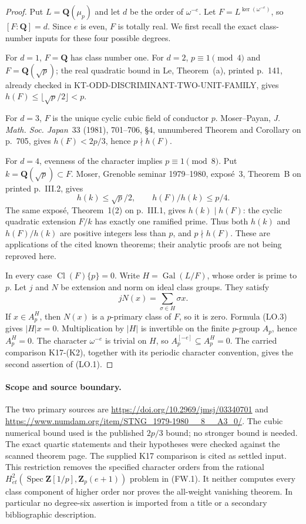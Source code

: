 \begin{proof}
Put $L=\mathbf Q(\mu_p)$ and let $d$ be the order of
$\omega^{-e}$. Let $F=L^{\ker(\omega^{-e})}$, so
$[F:\mathbf Q]=d$. Since $e$ is even, $F$ is totally real.
We first recall the exact class-number inputs for these four
possible degrees.

For $d=1$, $F=\mathbf Q$ has class number one. For $d=2$,
$p\equiv1\pmod4$ and $F=\mathbf Q(\sqrt p)$; the real
quadratic bound in Le, Theorem~(a), printed p.~141, already
checked in KT-ODD-DISCRIMINANT-TWO-UNIT-FAMILY, gives
$h(F)\le\lfloor\sqrt p/2\rfloor<p$.

For $d=3$, $F$ is the unique cyclic cubic field of conductor
$p$. Moser--Payan, \emph{J. Math. Soc. Japan}~33 (1981),
701--706, \S4, unnumbered Theorem and Corollary on p.~705,
gives $h(F)<2p/3$, hence $p\nmid h(F)$.

For $d=4$, evenness of the character implies
$p\equiv1\pmod8$. Put $k=\mathbf Q(\sqrt p)\subset F$.
Moser, Grenoble seminar 1979--1980, expos\'e~3,
Theorem~B on printed p.~III.2, gives
\[
            h(k)\le\sqrt p/2,\qquad h(F)/h(k)\le p/4.  \tag{LO.2}
\]
The same expos\'e, Theorem~1(2) on p.~III.1, gives
$h(k)\mid h(F)$: the cyclic quadratic extension $F/k$
has exactly one ramified prime. Thus both $h(k)$ and
$h(F)/h(k)$ are positive integers less than $p$, and
$p\nmid h(F)$. These are applications of the cited known
theorems; their analytic proofs are not being reproved here.

In every case $\operatorname{Cl}(F)\{p\}=0$.
Write $H=\operatorname{Gal}(L/F)$, whose order is prime to
$p$. Let $j$ and $N$ be extension and norm on ideal class
groups. They satisfy
\[
                      jN(x)=\sum_{\sigma\in H}\sigma x.
                                                               \tag{LO.3}
\]
If $x\in A_p^H$, then $N(x)$ is a $p$-primary class of $F$,
so it is zero. Formula (LO.3) gives $|H|x=0$.
Multiplication by $|H|$ is invertible on the finite $p$-group
$A_p$, hence $A_p^H=0$. The character $\omega^{-e}$ is
trivial on $H$, so $A_p^{[-e]}\subseteq A_p^H=0$.
The carried comparison K17-(K2), together with its periodic
character convention, gives the second assertion of (LO.1).
\end{proof}

\paragraph{Scope and source boundary.}
The two primary sources are
\url{https://doi.org/10.2969/jmsj/03340701} and
\url{https://www.numdam.org/item/STNG_1979-1980__8__A3_0/}.
The cubic numerical bound used is the published $2p/3$ bound;
no stronger bound is needed. The exact quartic statements and
their hypotheses were checked against the scanned theorem page.
The supplied K17 comparison is cited as settled input.
This restriction removes the specified character orders from
the rational $H^2_{\acute et}(\operatorname{Spec}\mathbf Z[1/p],
\mathbf Z_p(e+1))$ problem in (FW.1). It neither computes every
class component of higher order nor proves the all-weight
vanishing theorem. In particular no degree-six assertion is
imported from a title or a secondary bibliographic description.
